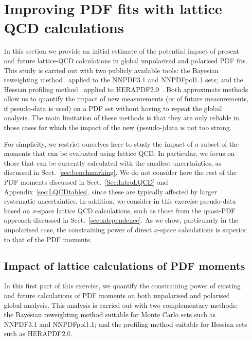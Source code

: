 \section{Improving PDF fits with lattice QCD calculations}
\label{sec:projections}

In this section we provide an initial estimate of the potential
impact of present and future lattice-QCD calculations
in global unpolarised and polarised PDF fits.
%
This study is carried out with two publicly available
tools: the
Bayesian reweighting
method~\cite{Ball:2011gg,Ball:2010gb} applied to the
NNPDF3.1 and NNPDFpol1.1 sets; and the Hessian
profiling method~\cite{Camarda:2015zba} applied to
HERAPDF2.0~\cite{Abramowicz:2015mha}.
%
Both approximate methods allow us to quantify the impact of new measurements
(or of future measurements, if pseudo-data is used) on a PDF set without
having to repeat the global analysis.
%
The main limitation of these methods is that they are only reliable
in those cases for which the impact of the new (pseudo-)data
is not too strong.

For simplicity, we restrict  ourselves here to study the
impact of a subset of the moments that can be
evaluated using lattice QCD.
%
In particular,
we focus on those that can be currently calculated
with the smallest uncertainties, as discussed in
Sect.~\ref{sec:benchmarking}.
%
We do not consider here
the rest of the PDF moments discussed in
Sect.~\ref{Sec:IntroLQCD} and Appendix~\ref{sec:LQCDtables},
since these are typically affected by larger systematic uncertainties.
%
In addition, we consider in this exercise pseudo-data based on $x$-space
lattice QCD calculations, such as those from the quasi-PDF approach
discussed in Sect.~\ref{sec:xdependence}.
%
As we show, particularly in the unpolarised case, the
constraining power of direct $x$-space calculations is
superior to that of the PDF moments.

\subsection{Impact of lattice calculations of PDF moments}
In this first part of this exercise, we quantify the
constraining power of existing and future calculations
of PDF moments on both unpolarised and polarised
global analysis.
%
This analysis is carried out with two complementary methods:
the Bayesian reweighting method suitable
for Monte Carlo sets such as NNPDF3.1 and NNPDFpol1.1; 
and the profiling method suitable for Hessian sets such as HERAPDF2.0.
%

